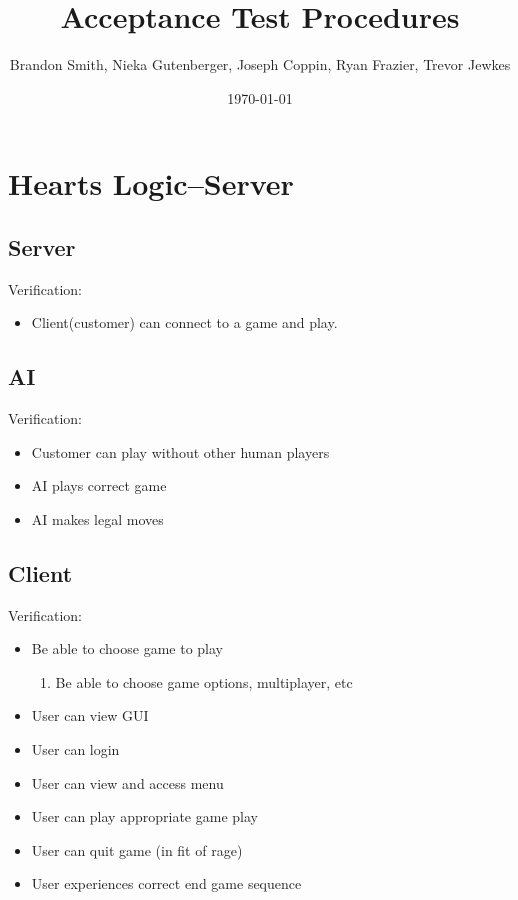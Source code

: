 \documentclass[11pt, titlepage]{article}
\author{Brandon Smith, Nieka Gutenberger, Joseph Coppin, Ryan Frazier, Trevor Jewkes}
\title{Acceptance Test Procedures}
\date{\today}
\begin{document}
	\maketitle
	\setcounter{tocdepth}{1}
	\section{Hearts Logic--Server}
	
		\subsection{Server}
		Verification:
		\begin{itemize}
			\item Client(customer) can connect to a game and play.
		\end{itemize}
		
		\subsection{AI}
		Verification:
			\begin{itemize}
				\item Customer can play without other human players
				\item AI plays correct game
				\item AI makes legal moves
			\end{itemize}
			
		\subsection{Client}
			Verification:
			\begin{itemize}
				\item  Be able to choose game to play
				\begin{enumerate}
					\item Be able to choose game options, multiplayer, etc
				\end{enumerate}
				\item User can view GUI
				\item User can login
				\item User can view and access menu
				\item User can play appropriate game play
				\item User can quit game (in fit of rage)
				\item User experiences correct end game sequence
			\end{itemize}
\end{document}
